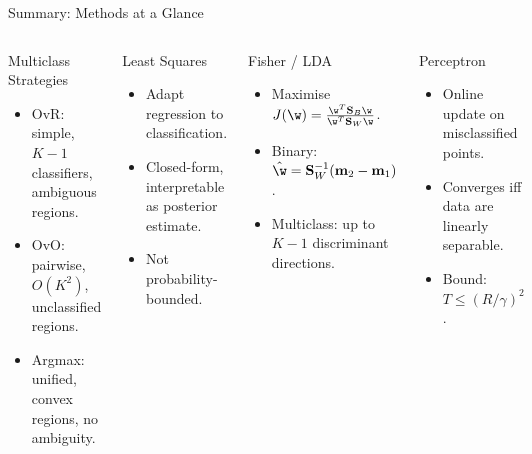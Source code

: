 \begin{frame}{Summary: Methods at a Glance}
  \begin{columns}[t]
      \begin{block}{Multiclass Strategies}
        \begin{itemize}
          \item OvR: simple, $K-1$ classifiers, ambiguous regions.
          \item OvO: pairwise, $O(K^2)$, unclassified regions.
          \item Argmax: unified, convex regions, no ambiguity.
        \end{itemize}
      \end{block}
      \vspace{0.4em}
      \begin{block}{Least Squares}
        \begin{itemize}
          \item Adapt regression to classification.
          \item Closed-form, interpretable as posterior estimate.
          \item Not probability-bounded.
        \end{itemize}
      \end{block}
      \begin{block}{Fisher / LDA}
        \begin{itemize}
          \item Maximise $J(\w) = \frac{\w^T\mathbf{S}_B\w}{\w^T\mathbf{S}_W\w}$.
          \item Binary: $\hat{\w} = \mathbf{S}_W^{-1}(\mathbf{m}_2-\mathbf{m}_1)$.
          \item Multiclass: up to $K-1$ discriminant directions.
        \end{itemize}
      \end{block}
      \vspace{0.4em}
      \begin{block}{Perceptron}
        \begin{itemize}
          \item Online update on misclassified points.
          \item Converges iff data are linearly separable.
          \item Bound: $T \le (R/\gamma)^2$.
        \end{itemize}
      \end{block}
  \end{columns}
\end{frame}

%
